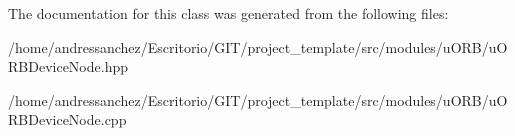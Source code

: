 The documentation for this class was generated from the following files\+:\begin{DoxyCompactItemize}
\item 
/home/andressanchez/\+Escritorio/\+G\+I\+T/project\+\_\+template/src/modules/u\+O\+R\+B/u\+O\+R\+B\+Device\+Node.\+hpp\item 
/home/andressanchez/\+Escritorio/\+G\+I\+T/project\+\_\+template/src/modules/u\+O\+R\+B/u\+O\+R\+B\+Device\+Node.\+cpp\end{DoxyCompactItemize}
